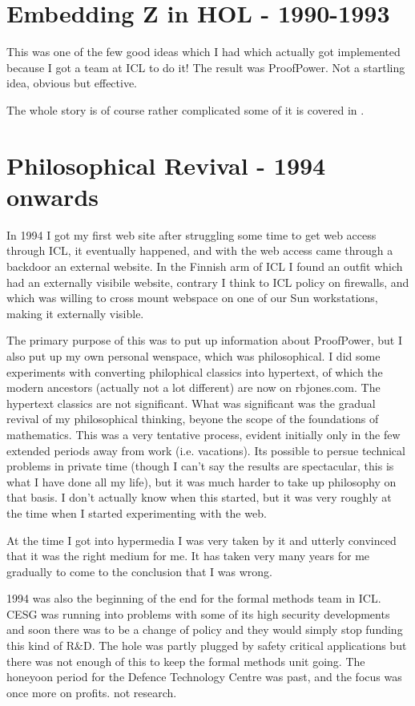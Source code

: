\documentclass[10pt,titlepage]{book}
\begin{document}
\section{Embedding Z in HOL - 1990-1993}

This was one of the few good ideas which I had which actually got implemented because I got a team at ICL to do it!
The result was ProofPower.
Not a startling idea, obvious but effective.

The whole story is of course rather complicated some of it is covered in \cite{rbjt014, rbjt015}.

\section{Philosophical Revival - 1994 onwards}

In 1994 I got my first web site after struggling some time to get web access through ICL, it eventually happened, and with the web access came through a backdoor an external website.
In the Finnish arm of ICL I found an outfit which had an externally visibile website, contrary I think to ICL policy on firewalls, and which was willing to cross mount webspace on one of our Sun workstations, making it externally visible.

The primary purpose of this was to put up information about ProofPower, but I also put up my own personal wenspace, which was philosophical.
I did some experiments with converting philophical classics into hypertext, of which the modern ancestors (actually not a lot different) are now on rbjones.com.
The hypertext classics are not significant.
What was significant was the gradual revival of my philosophical thinking, beyone the scope of the foundations of mathematics.
This was a very tentative process, evident initially only in the few extended periods away from work (i.e. vacations).
Its possible to persue technical problems in private time (though I can't say the results are spectacular, this is what I have done all my life), but it was much harder to take up philosophy on that basis.
I don't actually know when this started, but it was very roughly at the time when I started experimenting with the web.

At the time I got into hypermedia I was very taken by it and utterly convinced that it was the right medium for me.
It has taken very many years for me gradually to come to the conclusion that I was wrong.

1994 was also the beginning of the end for the formal methods team in ICL.
CESG was running into problems with some of its high security developments and soon there was to be a change of policy and they would simply stop funding this kind of R\&D.
The hole was partly plugged by safety critical applications but there was not enough of this to keep the formal methods unit going.
The honeyoon period for the Defence Technology Centre was past, and the focus was once more on profits. not research.
\end{document}
